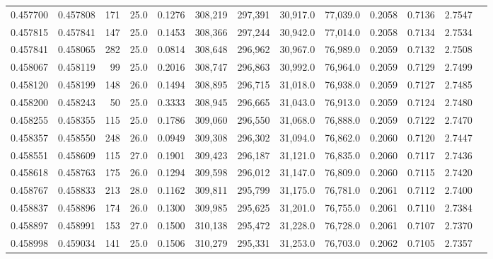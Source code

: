 \begin{tabular}{rrrrrrrrrrrrr}
0.457700 & 0.457808 &   171 & 25.0 &                                     0.1276 & 308,219 & 297,391 &  30,917.0 &  77,039.0 & 0.2058 & 0.7136 & 2.7547 \\
0.457815 & 0.457841 &   147 & 25.0 &                                     0.1453 & 308,366 & 297,244 &  30,942.0 &  77,014.0 & 0.2058 & 0.7134 & 2.7534 \\
0.457841 & 0.458065 &   282 & 25.0 &                                     0.0814 & 308,648 & 296,962 &  30,967.0 &  76,989.0 & 0.2059 & 0.7132 & 2.7508 \\
0.458067 & 0.458119 &    99 & 25.0 &                                     0.2016 & 308,747 & 296,863 &  30,992.0 &  76,964.0 & 0.2059 & 0.7129 & 2.7499 \\
0.458120 & 0.458199 &   148 & 26.0 &                                     0.1494 & 308,895 & 296,715 &  31,018.0 &  76,938.0 & 0.2059 & 0.7127 & 2.7485 \\
0.458200 & 0.458243 &    50 & 25.0 &                                     0.3333 & 308,945 & 296,665 &  31,043.0 &  76,913.0 & 0.2059 & 0.7124 & 2.7480 \\
0.458255 & 0.458355 &   115 & 25.0 &                                     0.1786 & 309,060 & 296,550 &  31,068.0 &  76,888.0 & 0.2059 & 0.7122 & 2.7470 \\
0.458357 & 0.458550 &   248 & 26.0 &                                     0.0949 & 309,308 & 296,302 &  31,094.0 &  76,862.0 & 0.2060 & 0.7120 & 2.7447 \\
0.458551 & 0.458609 &   115 & 27.0 &                                     0.1901 & 309,423 & 296,187 &  31,121.0 &  76,835.0 & 0.2060 & 0.7117 & 2.7436 \\
0.458618 & 0.458763 &   175 & 26.0 &                                     0.1294 & 309,598 & 296,012 &  31,147.0 &  76,809.0 & 0.2060 & 0.7115 & 2.7420 \\
0.458767 & 0.458833 &   213 & 28.0 &                                     0.1162 & 309,811 & 295,799 &  31,175.0 &  76,781.0 & 0.2061 & 0.7112 & 2.7400 \\
0.458837 & 0.458896 &   174 & 26.0 &                                     0.1300 & 309,985 & 295,625 &  31,201.0 &  76,755.0 & 0.2061 & 0.7110 & 2.7384 \\
0.458897 & 0.458991 &   153 & 27.0 &                                     0.1500 & 310,138 & 295,472 &  31,228.0 &  76,728.0 & 0.2061 & 0.7107 & 2.7370 \\
0.458998 & 0.459034 &   141 & 25.0 &                                     0.1506 & 310,279 & 295,331 &  31,253.0 &  76,703.0 & 0.2062 & 0.7105 & 2.7357 \\

\end{tabular}
